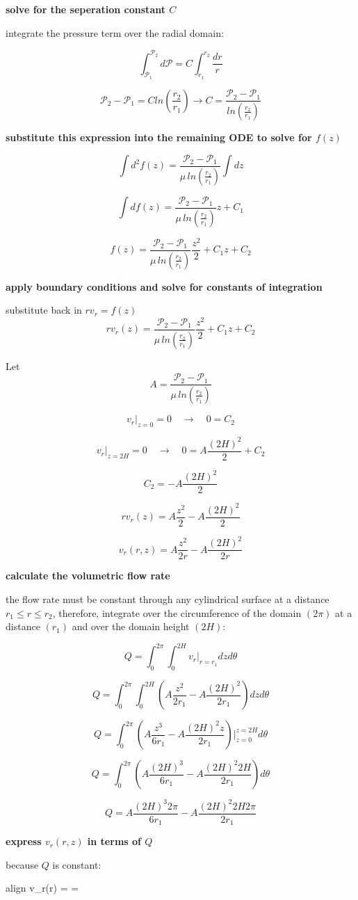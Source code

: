 \documentclass[letterpaper, 10pt, oneside]{article}
\newenvironment{dd}[1]{
	\noindent
	\textbf{\normalsize{#1}}
	\hspace{0.1in}
	\small
	\rmfamily
	}
	{\medskip}
\newcommand{\bes}{\begin{equation*}}
\newcommand{\ees}{\end{equation*}}
\newcommand{\bdd}{\begin{dd}}
\newcommand{\edd}{\end{dd}}
\newcommand{\boxedeq}[2]{\begin{empheq}[box={\fboxsep=6pt\fbox}]{align}\label{#1}#2\end{empheq}}
\begin{document}
\bdd{solve for the seperation constant $C$}

	integrate the pressure term over the radial domain:

	\bes \int_{\mathscr{P}_1}^{\mathscr{P}_2} d\mathscr{P} = C \int_{r_1}^{r_2} \frac{dr}{r}  \ees

	\bes \mathscr{P}_2 - \mathscr{P}_1 = C ln \left(\frac{r_2}{r_1}\right) \rightarrow C=\frac{\mathscr{P}_2 - \mathscr{P}_1}{ln \left(\frac{r_2}{r_1}\right)}\ees

\edd

\bdd{substitute this expression into the remaining ODE to solve for $f(z)$}

	\bes \int d^2 f(z) =  \frac{\mathscr{P}_2 - \mathscr{P}_1}{ \mu  \,ln\left(\frac{r_2}{r_1}\right)} \int dz \ees

	\bes \int df(z) =  \frac{\mathscr{P}_2 - \mathscr{P}_1}{ \mu  \,ln\left(\frac{r_2}{r_1}\right)} z + C_1 \ees

	\bes f(z) =  \frac{\mathscr{P}_2 - \mathscr{P}_1}{ \mu  \,ln\left(\frac{r_2}{r_1}\right)} \frac{z^2}{2} + C_1z + C_2 \ees
\edd

\bdd{apply boundary conditions and solve for constants of integration}

	substitute back in $rv_r = f(z)$
	\bes rv_r(z) =  \frac{\mathscr{P}_2 - \mathscr{P}_1}{ \mu  \,ln\left(\frac{r_2}{r_1}\right)} \frac{z^2}{2} + C_1z + C_2 \ees

	Let
	\bes A = \frac{\mathscr{P}_2 - \mathscr{P}_1}{ \mu  \,ln\left(\frac{r_2}{r_1}\right)} \ees

	\bes v_r \Bigr|_{z=0} = 0 \quad \rightarrow \quad 0 =  C_2 \ees

	\bes v_r\Bigr|_{z=2H} = 0 \quad \rightarrow \quad 0 = A \frac{(2H)^2}{2} +C_2\ees

	 \bes C_2 = -A \frac{(2H)^2}{2}\ees

	 \bes rv_r(z) =  A \frac{z^2}{2} -A \frac{(2H)^2}{2}\ees

	 \bes v_r(r,z) =  A \frac{z^2}{2r} -A \frac{(2H)^2}{2r}\ees
\edd

\bdd{calculate the volumetric flow rate}

	the flow rate must be constant through any cylindrical surface at a distance $r_1 \le r \le r_2$, therefore, integrate over the circumference of the domain $(2\pi)$ at a distance $(r_1)$ and over the domain height $(2H)$:

	\bes Q = \int_0^{2\pi} \int_0^{2H} v_r \Bigr|_{r=r_1} dz d\theta\ees

	\bes Q = \int_0^{2\pi} \int_0^{2H} \left(A \frac{z^2}{2r_1} -A \frac{(2H)^2}{2r_1} \right) dz d\theta\ees

	\bes Q = \int_0^{2\pi} \left(A \frac{z^3}{6r_1} -A \frac{(2H)^2 z}{2r_1} \right) \Bigr|_{z=0}^{z=2H} d\theta \ees

	\bes Q = \int_0^{2\pi} \left(A \frac{(2H)^3}{6r_1} -A \frac{(2H)^2 2H}{2r_1} \right) d\theta \ees

	\bes Q = A \frac{(2H)^3 2\pi}{6r_1} -A \frac{(2H)^2 2H 2\pi}{2r_1} \ees
\edd

\bdd{express $v_r (r,z)$ in terms of $Q$}

because $Q$ is constant:
	\boxedeq{c}{ v_r(r) =  = }
\edd
\end{document}
